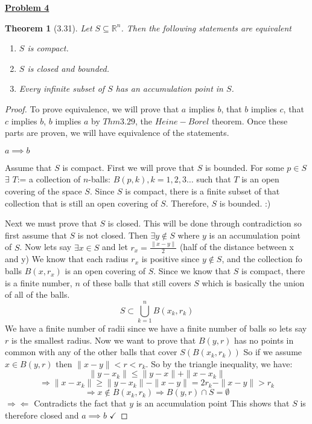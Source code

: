 \documentclass[aps,pra,notitlepage,amsmath,amssymb,letterpaper,12pt]{revtex4-1}
\newtheorem{theorem}{Theorem}
\begin{document}
\underline{\textbf{Problem 4}}
\begin{theorem}[3.31]
Let $S \subseteq \mathbb{R}^n$. Then the following statements are equivalent
\begin{enumerate}[\upshape a)]
  \item $S$ is compact. %
  \item $S$ is closed and bounded.
  \item Every infinite subset of $S$ has an accumulation point in $S$.
\end{enumerate}
\end{theorem}
\begin{proof}
To prove equivalence, we will prove that \(a\) implies \(b\),
that \(b\) implies \(c\), that \(c\) implies \(b\), \(b\) implies \(a\) by \(Thm3.29\),
the \(Heine-Borel\) theorem. Once these parts are proven, we will
have equivalence of the statements.

    \(a\implies b\)

    Assume that \(S\) is compact. First we will prove that \(S\) is bounded.
For some \(p\in S\) \(\exists\) \(T\):= a collection of \(n\)-balls:
\(B(p,k), k=1,2,3\ldots\) such that \(T\) is an open covering of the
space \(S\). Since \(S\) is compact, there is a finite subset of that
collection that is still an open covering of \(S\). Therefore, \(S\) is
bounded. :)

    Next we must prove that \(S\) is closed. This will be done through
contradiction so first assume that \(S\) is not closed. Then
\(\exists y \notin S\) where \(y\) is an accumulation point of \(S\).
Now lets say \(\exists x\in S\) and let \(r_x = \frac{\| x-y\|}{2}\)
(half of the distance between x and y) We know that each radius \(r_x\)
is positive since \(y\notin S\), and the collection fo balls
\(B(x,r_x)\) is an open covering of \(S\). Since we know that \(S\) is
compact, there is a finite number, \(n\) of these balls that still
covers \(S\) which is basically the union of all of the balls.
\[S\subset \bigcup\limits_{k=1}^{n} B(x_k,r_k)\] We have a finite number
of radii since we have a finite number of balls so lets say \(r\) is the
smallest radius. Now we want to prove that \(B(y,r)\) has no points in
common with any of the other balls that cover
\(S\left(B\left(x_k,r_k\right)\right)\) So if we assume \(x\in B(y,r)\)
then \(\| x-y\| <r<r_k\). So by the triangle inequality, we have:
\[\| y-x_k\|\leq\| y-x\| +\| x-x_k\| \]
\[\Rightarrow \| x-x_k\|\geq\| y-x_k\| -\| x-y\| = 2r_k-\| x-y\| >r_k\]
\[\Rightarrow x\notin B(x_k,r_k)\Rightarrow B(y,r)\cap S = \emptyset\]
\(\Rightarrow\Leftarrow\) Contradicts the fact that \(y\) is an
accumulation point This shows that \(S\) is therefore closed and
\(a\implies b\) \(\checkmark\)


\end{proof}
\end{document}
